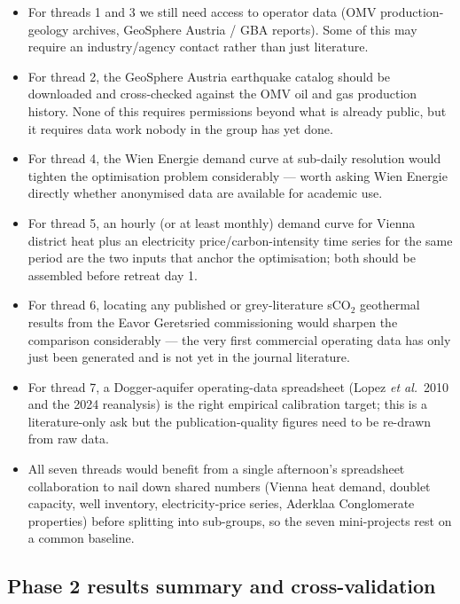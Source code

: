 \documentclass{article}
\begin{document}
\begin{itemize}
\item For threads 1 and 3 we still need access to operator data
(OMV production-geology archives, GeoSphere Austria / GBA reports).
Some of this may require an industry/agency contact rather than
just literature.
\item For thread 2, the GeoSphere Austria earthquake catalog should
be downloaded and cross-checked against the OMV oil and gas
production history. None of this requires permissions beyond what
is already public, but it requires data work nobody in the group
has yet done.
\item For thread 4, the Wien Energie demand curve at sub-daily
resolution would tighten the optimisation problem considerably ---
worth asking Wien Energie directly whether anonymised data are
available for academic use.
\item For thread 5, an hourly (or at least monthly) demand curve for
Vienna district heat plus an electricity price/carbon-intensity time
series for the same period are the two inputs that anchor the
optimisation; both should be assembled before retreat day 1.
\item For thread 6, locating any published or grey-literature sCO$_2$
geothermal results from the Eavor Geretsried commissioning would
sharpen the comparison considerably --- the very first commercial
operating data has only just been generated and is not yet in the
journal literature.
\item For thread 7, a Dogger-aquifer operating-data spreadsheet (Lopez
\emph{et al.}\ 2010 and the 2024 reanalysis) is the right empirical
calibration target; this is a literature-only ask but the
publication-quality figures need to be re-drawn from raw data.
\item All seven threads would benefit from a single afternoon's
spreadsheet collaboration to nail down shared numbers (Vienna heat
demand, doublet capacity, well inventory, electricity-price series,
Aderklaa Conglomerate properties) before splitting into sub-groups,
so the seven mini-projects rest on a common baseline.
\end{itemize}

\subsection*{Phase 2 results summary and cross-validation}
\end{document}
